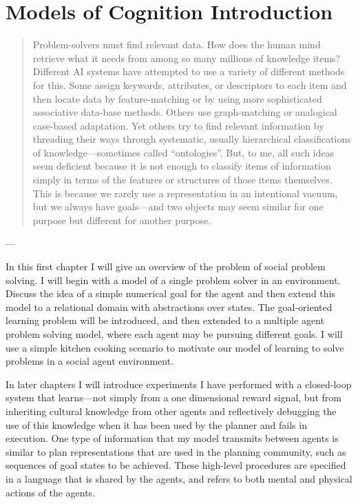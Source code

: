 \chapter{Models of Cognition Introduction}\label{ch:models_of_cognition_introduction}

\begin{quote}
Problem-solvers must find relevant data.  How does the human mind
retrieve what it needs from among so many millions of knowledge items?
Different AI systems have attempted to use a variety of different
methods for this.  Some assign keywords, attributes, or descriptors to
each item and then locate data by feature-matching or by using more
sophisticated associative data-base methods.  Others use
graph-matching or analogical case-based adaptation.  Yet others try to
find relevant information by threading their ways through systematic,
usually hierarchical classifications of knowledge---sometimes called
``ontologies''.  But, to me, all such ideas seem deficient because it
is not enough to classify items of information simply in terms of the
features or structures of those items themselves.  This is because we
rarely use a representation in an intentional vacuum, but we always
have goals---and two objects may seem similar for one purpose but
different for another purpose.
\end{quote}
\begin{flushright}
 --- 
\end{flushright}

In this first chapter I will give an overview of the problem of social
problem solving.  I will begin with a model of a single problem
solver in an environment.  Discuss the idea of a simple numerical goal
for the agent and then extend this model to a relational domain with
abstractions over states.  The goal-oriented learning problem will be
introduced, and then extended to a multiple agent problem solving
model, where each agent may be pursuing different goals.  I will use a
simple kitchen cooking scenario to motivate our model of learning to
solve problems in a social agent environment.

In later chapters I will introduce experiments I have performed with a
closed-loop system that learns---not simply from a one dimensional
reward signal, but from inheriting cultural knowledge from other
agents and reflectively debugging the use of this knowledge when it
has been used by the planner and fails in execution.  One type of
information that my model transmits between agents is similar to plan
representations that are used in the planning community, such as
sequences of goal states to be achieved.  These high-level procedures
are specified in a language that is shared by the agents, and refers
to both mental and physical actions of the agents.

